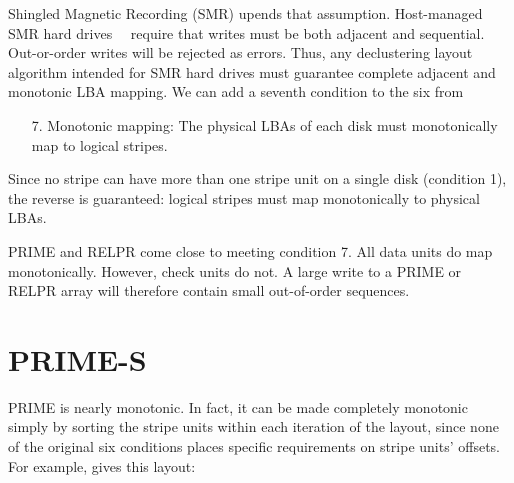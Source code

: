 \documentclass[onecolumn,draft]{IEEEtran}
\begin{document}
Shingled Magnetic Recording (SMR) upends that assumption.  Host-managed SMR hard
drives~\cite{zbc}~\cite{zba} require that writes must be both adjacent and
sequential.  Out-or-order writes will be rejected as errors.  Thus, any
declustering layout algorithm intended for SMR hard drives must guarantee
complete adjacent and monotonic LBA mapping.  We can add a seventh condition to
the six from ~\cite{relpr}

\begin{enumerate}
  \item[7.] Monotonic mapping: The physical LBAs of each disk must monotonically
  map to logical stripes.
\end{enumerate}

Since no stripe can have more than one stripe unit on a single disk (condition
1), the reverse is guaranteed: logical stripes must map monotonically to
physical LBAs.

PRIME and RELPR come close to meeting condition 7.  All data units do map
monotonically.  However, check units do not.  A large write to a PRIME or RELPR
array will therefore contain small out-of-order sequences.

\section{PRIME-S}

PRIME is nearly monotonic.  In fact, it can be made completely monotonic simply
by sorting the stripe units within each iteration of the layout, since none of
the original six conditions places specific requirements on stripe units'
offsets. For example, \cite{relpr} gives this layout:
\end{document}
